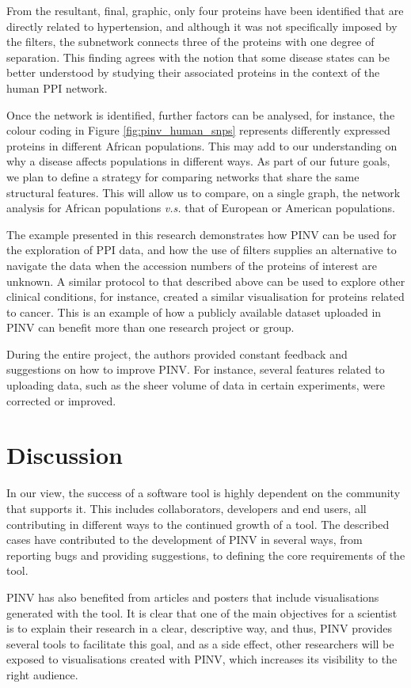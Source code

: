 From the resultant, final, graphic, only four proteins have been identified that are directly related to hypertension, and although it was not specifically imposed by the filters, the subnetwork connects three of the proteins with one degree of separation. This finding agrees with the notion that some disease states can be better understood by studying their associated proteins in the context of the human PPI network.

Once the network is identified, further factors can be analysed, for instance, the colour coding in Figure \ref{fig:pinv_human_snps} represents differently expressed proteins in different African populations. This may add to our understanding on why a disease affects populations in different ways. As part of our future goals, we plan to define a strategy for comparing networks that share the same structural features. This will allow us to compare, on a single graph, the network analysis for African populations \emph{v.s.} that of European or American populations. 

The example presented in this research demonstrates how PINV can be used for the exploration of PPI data, and how the use of filters supplies an alternative to navigate the data when the accession numbers of the proteins of interest are unknown. A similar protocol to that described above can be used to explore other clinical conditions, for instance, \cite{HEE2014} created a similar visualisation for proteins related to cancer. This is an example of how a publicly available dataset uploaded in PINV can benefit more than one research project or group.

During the entire project, the authors provided constant feedback and suggestions on how to improve PINV. For instance, several features related to uploading data, such as the sheer volume of data in certain experiments, were corrected or improved.

\section{Discussion}
In our view, the success of a software tool is highly dependent on the community that supports it.  This includes collaborators, developers and end users, all contributing in different ways to the continued growth of a tool. The described cases have contributed to the development of PINV in several ways, from reporting bugs and providing suggestions, to defining the core requirements of the tool. 

PINV has also benefited from articles and posters that include visualisations generated with the tool. It is clear that one of the main objectives for  a scientist is to explain their research in a clear, descriptive way, and thus, PINV provides several tools to facilitate this goal, and as a side effect, other researchers will be exposed to visualisations created with PINV, which increases its visibility to the right audience. 

